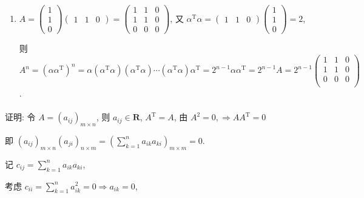 \begin{enumerate}
			 \item %
			       $A = \begin{pmatrix}
					       1 \\
					       1 \\
					       0
				       \end{pmatrix}
				       \begin{pmatrix}
					       1 & 1 & 0
				       \end{pmatrix} = \begin{pmatrix}
					       1 & 1 & 0 \\
					       1 & 1 & 0 \\
					       0 & 0 & 0
				       \end{pmatrix}$,
			       又 $\alpha^{\mathrm{T}} \alpha = \begin{pmatrix}
					       1 & 1 & 0
				       \end{pmatrix}
				       \begin{pmatrix}
					       1 \\
					       1 \\
					       0
				       \end{pmatrix} = 2$,

			       则 $A^n = (\alpha \alpha^{\mathrm{T}})^n = \alpha (\alpha^{\mathrm{T}} \alpha) (\alpha^{\mathrm{T}} \alpha) \cdots (\alpha^{\mathrm{T}} \alpha) \alpha^{\mathrm{T}} = 2^{n-1}\alpha\alpha^{\mathrm{T}}=2^{n-1}A=2^{n-1}
				       \begin{pmatrix}
					       1 & 1 & 0 \\
					       1 & 1 & 0 \\
					       0 & 0 & 0 \\
				       \end{pmatrix}$.
		 \end{enumerate}

	 \paragraph{} %
		 证明: 令 $A = (a_{ij})_{m \times n}$, 则 $a_{ij} \in \mathbf{R}$, $A^{\mathrm{T}} = A$, 由 $A^2 = 0, \Rightarrow AA^{\mathrm{T}} = 0$

		 即 $(a_{ij})_{m \times n} (a_{ji})_{n \times m} = \left( \sum_{k=1}^{n} a_{ik} a_{ki} \right)_{m \times m} = 0$.

		 记 $c_{ij} = \sum_{k=1}^{n} a_{ik} a_{ki}$,

		 考虑 $c_{ii} = \sum_{k=1}^{n} a_{ik}^2 = 0 \Rightarrow a_{ik} = 0$,

